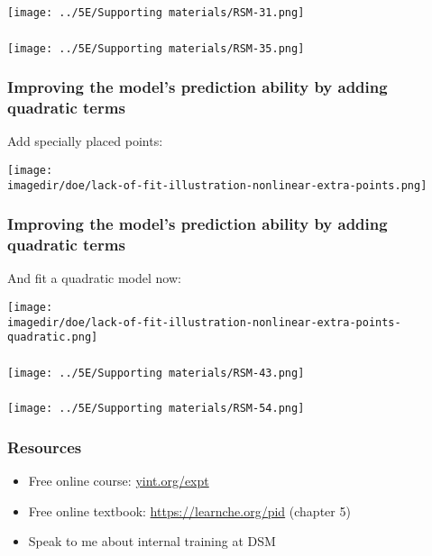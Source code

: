 \documentclass[handout,11pt,aspectratio=169,mathserif]{beamer}
\begin{document}
\begin{frame}\frametitle{}
	\centerline{\texttt{[image: ../5E/Supporting materials/RSM-31.png]}}
\end{frame}
\begin{frame}\frametitle{}
	\centerline{\texttt{[image: ../5E/Supporting materials/RSM-35.png]}}
\end{frame}
\begin{frame}\frametitle{Improving the model's prediction ability by adding quadratic terms}
	Add specially placed points:
	
	\centerline{\texttt{[image: \\imagedir/doe/lack-of-fit-illustration-nonlinear-extra-points.png]}}
\end{frame}
\begin{frame}\frametitle{Improving the model's prediction ability by adding quadratic terms}
	And fit a quadratic model now:
	
	\centerline{\texttt{[image: \\imagedir/doe/lack-of-fit-illustration-nonlinear-extra-points-quadratic.png]}}
\end{frame}
\begin{frame}\frametitle{}
	\centerline{\texttt{[image: ../5E/Supporting materials/RSM-43.png]}}
\end{frame}
\begin{frame}\frametitle{}
	\centerline{\texttt{[image: ../5E/Supporting materials/RSM-54.png]}}
\end{frame}

\begin{frame}\frametitle{Resources}
	\begin{itemize}
		\item	Free online course: \href{http://yint.org/expt}{yint.org/expt}
		\item	Free online textbook: \href{https://learnche.org/pid/design-analysis-experiments/index}{https://learnche.org/pid} (chapter 5)
		\item	Speak to me about internal training at DSM
	\end{itemize}
\end{frame}
\end{document}
